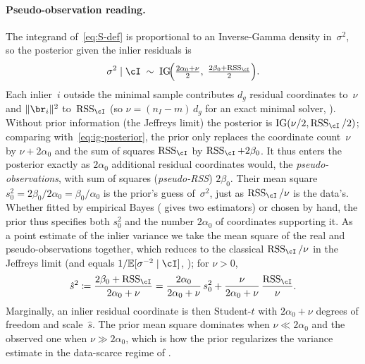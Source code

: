 \documentclass{article}
\DeclareMathOperator{\RSS}{RSS}
\newcommand{\IG}{\mathrm{IG}}
\newcommand{\invgamma}{Inverse-Gamma\xspace}
\begin{document}
\paragraph{Pseudo-observation reading.}\label{par:pseudo-obs}
The integrand of~\eqref{eq:S-def} is proportional to an \invgamma
density in~$\sigma^2$, so the posterior given the inlier residuals is
\begin{equation}
	\sigma^2 \mid \cI \;\sim\;
	\IG\!\Bigl(
	\tfrac{2\alpha_0 + \nu}{2},\;
	\tfrac{2\beta_0 + \RSS_\cI}{2}
	\Bigr).
	\label{eq:ig-posterior}
\end{equation}
Each inlier~$i$ outside the minimal sample contributes $d_g$ residual
coordinates to~$\nu$ and $\|\br_i\|^2$ to~$\RSS_\cI$ (so
$\nu = (n_I - m)\,d_g$ for an exact minimal solver, ).  Without prior
information (the Jeffreys limit) the posterior is
$\IG(\nu/2, \RSS_\cI/2)$; comparing with~\eqref{eq:ig-posterior}, the prior only replaces the
coordinate count~$\nu$ by $\nu + 2\alpha_0$ and the sum of squares
$\RSS_\cI$ by $\RSS_\cI + 2\beta_0$.  It thus enters the posterior
exactly as $2\alpha_0$ additional residual coordinates would, the
\emph{pseudo-observations}, with sum of squares
(\emph{pseudo-RSS}) $2\beta_0$.  Their mean square
$s_0^2 = 2\beta_0/2\alpha_0 = \beta_0/\alpha_0$ is the prior's guess
of~$\sigma^2$, just as $\RSS_\cI/\nu$ is the data's.  Whether fitted by empirical
Bayes ( gives two estimators) or chosen
by hand, the prior thus specifies both $s_0^2$ and the
number $2\alpha_0$ of coordinates supporting it.  As a point estimate of the
inlier variance we take the mean square of the real and
pseudo-observations together, which reduces to the classical
$\RSS_\cI/\nu$ in the Jeffreys limit (and equals
$1/\mathbb{E}[\sigma^{-2} \mid \cI]$, );
for $\nu > 0$,
\begin{equation*}
	\hat s^2 \coloneqq \frac{2\beta_0 + \RSS_\cI}{2\alpha_0 + \nu}
	= \frac{2\alpha_0}{2\alpha_0 + \nu}\,s_0^2
	+ \frac{\nu}{2\alpha_0 + \nu}\,\frac{\RSS_\cI}{\nu}.
\end{equation*}
Marginally, an inlier residual coordinate is then Student-$t$ with
$2\alpha_0 + \nu$ degrees of freedom and scale~$\hat s$.  The prior
mean square dominates when $\nu \ll 2\alpha_0$ and the observed one
when $\nu \gg 2\alpha_0$, which is how the prior regularizes the variance
estimate in the data-scarce regime of .
\end{document}
